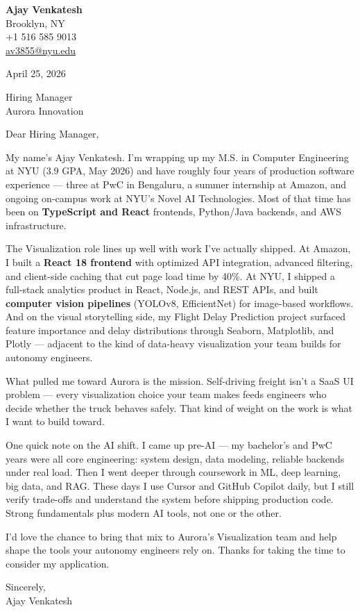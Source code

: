\documentclass[letterpaper,11pt]{article}
\begin{document}
\begin{flushleft}
\textbf{\large Ajay Venkatesh} \\
Brooklyn, NY \\
+1 516 585 9013 \\
\href{mailto:av3855@nyu.edu}{av3855@nyu.edu}
\end{flushleft}

\vspace{10pt}

April 25, 2026

\vspace{6pt}

Hiring Manager \\
Aurora Innovation

\vspace{10pt}

Dear Hiring Manager,

My name's Ajay Venkatesh. I'm wrapping up my M.S. in Computer Engineering at NYU (3.9 GPA, May 2026) and have roughly four years of production software experience --- three at PwC in Bengaluru, a summer internship at Amazon, and ongoing on-campus work at NYU's Novel AI Technologies. Most of that time has been on \textbf{TypeScript and React} frontends, Python/Java backends, and AWS infrastructure.

The Visualization role lines up well with work I've actually shipped. At Amazon, I built a \textbf{React 18 frontend} with optimized API integration, advanced filtering, and client-side caching that cut page load time by 40\%. At NYU, I shipped a full-stack analytics product in React, Node.js, and REST APIs, and built \textbf{computer vision pipelines} (YOLOv8, EfficientNet) for image-based workflows. And on the visual storytelling side, my Flight Delay Prediction project surfaced feature importance and delay distributions through Seaborn, Matplotlib, and Plotly --- adjacent to the kind of data-heavy visualization your team builds for autonomy engineers.

What pulled me toward Aurora is the mission. Self-driving freight isn't a SaaS UI problem --- every visualization choice your team makes feeds engineers who decide whether the truck behaves safely. That kind of weight on the work is what I want to build toward.

One quick note on the AI shift. I came up pre-AI --- my bachelor's and PwC years were all core engineering: system design, data modeling, reliable backends under real load. Then I went deeper through coursework in ML, deep learning, big data, and RAG. These days I use Cursor and GitHub Copilot daily, but I still verify trade-offs and understand the system before shipping production code. Strong fundamentals plus modern AI tools, not one or the other.

I'd love the chance to bring that mix to Aurora's Visualization team and help shape the tools your autonomy engineers rely on. Thanks for taking the time to consider my application.

\vspace{12pt}

Sincerely, \\
Ajay Venkatesh
\end{document}
